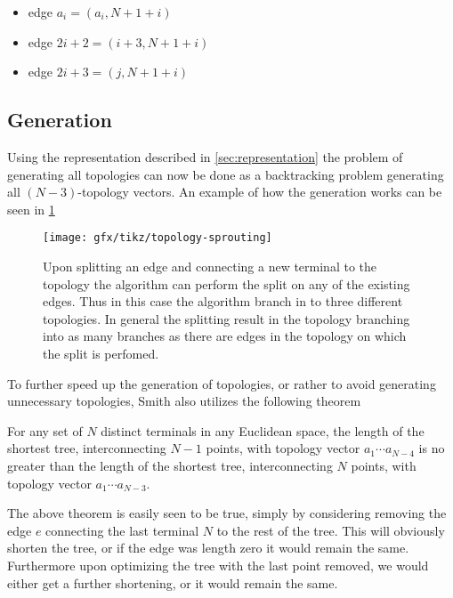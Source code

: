 \begin{itemize}
\item edge $a_{i} = (a_{i},N+1+i)$
\item edge $ 2i + 2 = (i+3,N+1+i)$
\item edge $ 2i + 3 = (j,N+1+i)$
\end{itemize}

\subsection{Generation}
\label{sec:generation}

Using the representation described in \cref{sec:representation} the problem of
generating all topologies can now be done as a backtracking problem generating
all $(N-3)$-topology vectors.  An example of how the generation works can be seen
in \cref{fig:topology-sprouting}

\begin{figure}[htbp]
  \centering
  \texttt{[image: gfx/tikz/topology-sprouting]}
  \caption{Upon splitting an edge and connecting a new terminal to the topology
    the algorithm can perform the split on any of the existing edges.  Thus in
    this case the algorithm branch in to three different topologies.  In general
    the splitting result in the topology branching into as many branches as
    there are edges in the topology on which the split is perfomed.\label{fig:topology-sprouting}}
\end{figure}

To further speed up the generation of topologies, or rather to avoid generating
unnecessary topologies, Smith also utilizes the following theorem
%
\begin{theorem}
  For any set of $N$ distinct terminals in any Euclidean space, the length of
  the shortest tree, interconnecting $N-1$ points, with topology vector
  $a_1 \cdots a_{N-4}$ is no greater than the length of the shortest tree,
  interconnecting $N$ points, with topology vector $a_1 \cdots a_{N-3}$.
\end{theorem}
%
The above theorem is easily seen to be true, simply by considering removing the
edge $e$ connecting the last terminal $N$ to the rest of the tree.  This will
obviously shorten the tree, or if the edge was length zero it would remain the same.  Furthermore upon
optimizing the tree with the last point removed, we would either get a further
shortening, or it would remain the same.

